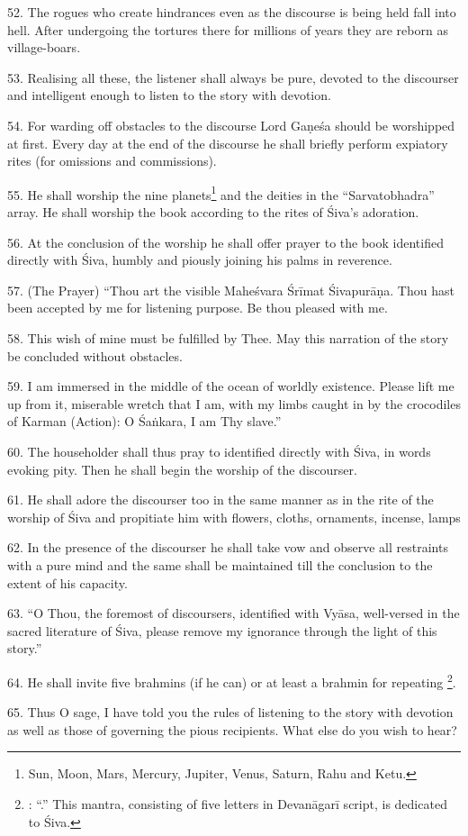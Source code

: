 52. The rogues who create hindrances even as the discourse is being held fall
into hell. After undergoing the tortures there for millions of years they are
reborn as village-boars.

53. Realising all these, the listener shall always be pure, devoted to the
discourser and intelligent enough to listen to the story with devotion.

54. For warding off obstacles to the discourse Lord Gaṇeśa should be worshipped
at first. Every day at the end of the discourse he shall briefly perform
expiatory rites (for omissions and commissions).

55. He shall worship the nine planets\footnote{Sun, Moon, Mars, Mercury, Jupiter,
Venus, Saturn, Rahu and Ketu.} and the deities in the “Sarvatobhadra” array. He
shall worship the book according to the rites of Śiva’s adoration.

56. At the conclusion of the worship he shall offer prayer to the book
identified directly with Śiva, humbly and piously joining his palms in reverence.

57. (The Prayer) “Thou art the visible Maheśvara Śrīmat Śivapurāṇa. Thou hast
been accepted by me for listening purpose. Be thou pleased with me.

58. This wish of mine must be fulfilled by Thee. May this narration of the story
be concluded without obstacles.

59. I am immersed in the middle of the ocean of worldly existence. Please lift
me up from it, miserable wretch that I am, with my limbs caught in by the
crocodiles of Karman (Action): O Śaṅkara, I am Thy slave.”

60. The householder shall thus pray to  identified directly with
Śiva, in words evoking pity. Then he shall begin the worship of the discourser.

61. He shall adore the discourser too in the same manner as in the rite of the
worship of Śiva and propitiate him with flowers, cloths, ornaments, incense,
lamps \etc

62. In the presence of the discourser he shall take vow and observe all
restraints with a pure mind and the same shall be maintained till the conclusion
to the extent of his capacity.

63. “O Thou, the foremost of discoursers, identified with Vyāsa, well-versed in
the sacred literature of Śiva, please remove my ignorance through the light of
this story.”

64. He shall invite five brahmins (if he can) or at least a brahmin for repeating
\footnote{: “.”
This mantra, consisting of five letters in Devanāgarī script, is dedicated to
Śiva.}.

65. Thus O sage, I have told you the rules of listening to the story with
devotion as well as those of governing the pious recipients. What else do you
wish to hear?
